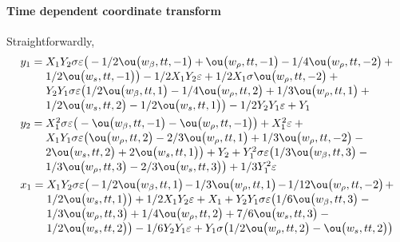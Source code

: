 \paragraph{Time dependent coordinate transform}  Straightforwardly,
\begin{align*}&
y_{1}=\ParMath{X_{1} Y_{2} \sigma  \eps \big(-1/2 \ou\big(w_{\beta },tt,-1\big)+
\ou\big(w_{\rho },tt,-1\big)-1/4 \ou\big(w_{\rho },tt,-2\big)+1/2 \ou
\big(w_{s},tt,-1\big)\big)-1/2 X_{1} Y_{2} \eps+1/2 X_{1} \sigma  \ou
\big(w_{\rho },tt,-2\big)+Y_{2} Y_{1} \sigma  \eps \big(1/2 \ou\big(w_{
\beta },tt,1\big)-1/4 \ou\big(w_{\rho },tt,2\big)+1/3 \ou\big(w_{\rho },
tt,1\big)+1/2 \ou\big(w_{s},tt,2\big)-1/2 \ou\big(w_{s},tt,1\big)\big)-1
/2 Y_{2} Y_{1} \eps+Y_{1}
}\\&
y_{2}=\ParMath{X_{1}^{2} \sigma  \eps \big(-\ou\big(w_{\beta },tt,-1\big)-\ou
\big(w_{\rho },tt,-1\big)\big)+X_{1}^{2} \eps+X_{1} Y_{1} \sigma  \eps 
\big(\ou\big(w_{\rho },tt,2\big)-2/3 \ou\big(w_{\rho },tt,1\big)+1/3 \ou
\big(w_{\rho },tt,-2\big)-2 \ou\big(w_{s},tt,2\big)+2 \ou\big(w_{s},tt,1
\big)\big)+Y_{2}+Y_{1}^{2} \sigma  \eps \big(1/3 \ou\big(w_{\beta },tt,3
\big)-1/3 \ou\big(w_{\rho },tt,3\big)-2/3 \ou\big(w_{s},tt,3\big)\big)+1
/3 Y_{1}^{2} \eps
}\\&
x_{1}=\ParMath{X_{1} Y_{2} \sigma  \eps \big(-1/2 \ou\big(w_{\beta },tt,1\big)-1/
3 \ou\big(w_{\rho },tt,1\big)-1/12 \ou\big(w_{\rho },tt,-2\big)+1/2 \ou
\big(w_{s},tt,1\big)\big)+1/2 X_{1} Y_{2} \eps+X_{1}+Y_{2} Y_{1} \sigma 
 \eps \big(1/6 \ou\big(w_{\beta },tt,3\big)-1/3 \ou\big(w_{\rho },tt,3
\big)+1/4 \ou\big(w_{\rho },tt,2\big)+7/6 \ou\big(w_{s},tt,3\big)-1/2 
\ou\big(w_{s},tt,2\big)\big)-1/6 Y_{2} Y_{1} \eps+Y_{1} \sigma  \big(1/2
 \ou\big(w_{\rho },tt,2\big)-\ou\big(w_{s},tt,2\big)\big)
 }
\end{align*}

